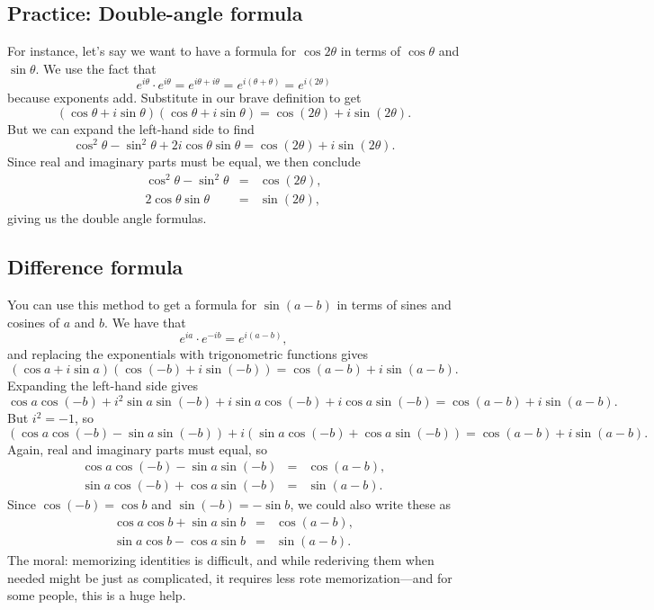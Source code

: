 \documentclass[12pt]{article}
\begin{document}
\subsection*{Practice: Double-angle formula}

For instance, let's say we want to have a formula for $\cos 2\theta$ in
terms of $\cos \theta$ and $\sin \theta$.  We use the fact that
$$
e^{i\theta} \cdot e^{i\theta} = e^{i\theta + i\theta} = e^{i(\theta + \theta)} = e^{i (2\theta)}
$$
because exponents add.  Substitute in our brave definition to get
$$
(\cos \theta + i \sin \theta)(\cos \theta + i \sin \theta) = \cos (2\theta) + i \sin (2\theta).
$$
But we can expand the left-hand side to find
$$
\cos^2 \theta - \sin^2 \theta + 2 i \cos \theta \sin \theta = \cos (2 \theta) + i \sin(2\theta).
$$
Since real and imaginary parts must be equal, we then conclude
\begin{eqnarray*}
  \cos^2 \theta - \sin^2 \theta &=& \cos (2 \theta), \\
 2 \cos \theta \sin \theta &=& \sin(2\theta),
\end{eqnarray*}
giving us the double angle formulas.

\subsection*{Difference formula}

You can use this method to get a formula for $\sin (a - b)$ in terms
of sines and cosines of $a$ and $b$.  We have that
$$
e^{ia} \cdot e^{-ib} = e^{i(a-b)},
$$
and replacing the exponentials with trigonometric functions gives
$$
(\cos a + i \sin a)(\cos (-b) + i \sin (-b)) = \cos(a-b) + i \sin (a-b).
$$
Expanding the left-hand side gives
$$
\cos a \cos (-b) + i^2 \sin a \sin (-b) + i \sin a \cos (-b) + i \cos a \sin (-b) = \cos (a-b) + i \sin(a-b).
$$
But $i^2 = -1$, so
$$
\left( \cos a \cos (-b) - \sin a \sin (-b) \right) + i \left( \sin a \cos (-b) + \cos a \sin (-b) \right) = \cos (a-b) + i \sin(a-b).
$$
Again, real and imaginary parts must equal, so
\begin{eqnarray*}
  \cos a \cos (-b) - \sin a \sin (-b) &=& \cos (a-b), \\
  \sin a \cos (-b) + \cos a \sin (-b) &=& \sin(a-b).
\end{eqnarray*}
Since $\cos (-b) = \cos b$ and $\sin (-b) = -\sin b$, we could also write these as
\begin{eqnarray*}
  \cos a \cos b + \sin a \sin b &=& \cos (a-b), \\
  \sin a \cos b - \cos a \sin b &=& \sin(a-b).
\end{eqnarray*}
The moral: memorizing identities is difficult, and while rederiving
them when needed might be just as complicated, it requires less rote
memorization---and for some people, this is a huge help.
\end{document}
